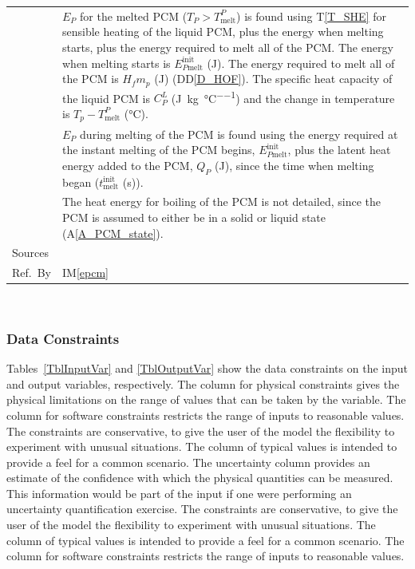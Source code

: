 \documentclass[12pt]{article}
\newcommand{\colAwidth}{0.13\textwidth}
\newcommand{\colBwidth}{0.82\textwidth}
\newcommand{\ddref}[1]{DD\ref{#1}}
\newcommand{\tref}[1]{T\ref{#1}}
\newcommand{\aref}[1]{A\ref{#1}}
\newcommand{\iref}[1]{IM\ref{#1}}
\begin{document}
\begin{minipage}{\textwidth}
\begin{tabular}{| p{\colAwidth} | p{\colBwidth}|}
      &$E_P$ for the melted PCM ($T_P > T_\text{melt}^P$) is found using \tref{T_SHE}
        for sensible heating of the liquid PCM, plus the energy when melting starts,
        plus the energy required to melt all of
        the PCM.  The energy when melting starts is
        $E_{P\text{melt}}^{\text{init}}$ (\si{\joule}).  The energy required to melt all of the PCM is 
        $H_f m_p$ (\si{\joule}) (\ddref{D_HOF}).  The specific heat capacity of the liquid PCM is
        $C_P^L$ (\si{\joule\per\kilogram\per\celsius}) and the change in temperature is $T_p - T_\text{melt}^P$ (\si{\celsius}).\\
      &$E_P$ during melting of the PCM is found using the energy required at the
        instant melting of the PCM begins, 
        $E_{P\text{melt}}^{\text{init}}$, plus the latent heat energy added to
        the PCM, $Q_P$ (\si{\joule}), since the time when melting began ($t_\text{melt}^\text{init}$ (\si{\second})).\\
      &The heat energy for boiling of the PCM is not detailed, since the
        PCM is assumed 
        to either be in a solid or liquid state (\aref{A_PCM_state}).
  \\
  \hline
  Sources&~\cite{Lightstone2012} \ \\
  \hline
  Ref.\ By & \iref{epcm}\\
  \hline
\end{tabular}
\end{minipage}\\

\subsubsection{Data Constraints} \label{sec_DataConstraints}    

Tables~\ref{TblInputVar} and \ref{TblOutputVar} show the data constraints on the
input and output variables, respectively.  The column for physical constraints gives
the physical limitations on the range of values that can be taken by the
variable.  The column for software constraints restricts the range of inputs to
reasonable values.  The constraints are conservative, to give the user of the
model the flexibility to experiment with unusual situations.  The column of
typical values is intended to provide a feel for a common scenario.  The
uncertainty column provides an estimate of the confidence with which the
physical quantities can be measured.  This information would be part of the
input if one were performing an uncertainty quantification exercise.  The
constraints are conservative, to give the user of the model the flexibility to
experiment with unusual situations. The column of typical values is intended to
provide a feel for a common scenario. The column for software constraints
restricts the range of inputs to reasonable values.
\end{document}
